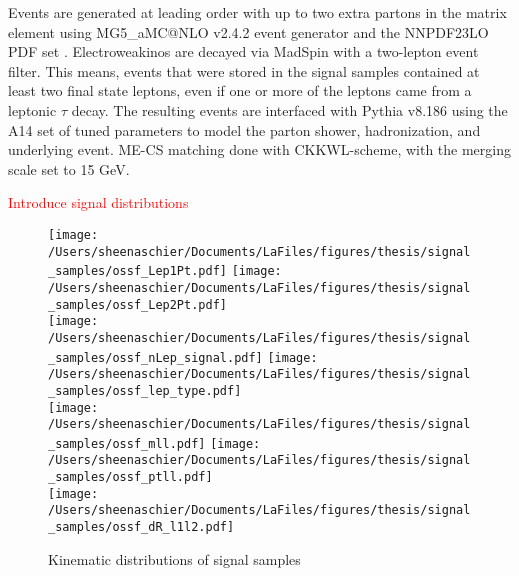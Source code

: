 Events are generated at leading order with up to two extra partons in the matrix element using MG5\_aMC@NLO v2.4.2 event generator \cite{alwall} and the NNPDF23LO PDF set \cite{ball}.  Electroweakinos are decayed via MadSpin \cite{1126-6708-2007-04-081, Artoisenet2013} with a two-lepton event filter.  This means, events that were stored in the signal samples contained at least two final state leptons, even if one or more of the leptons came from a leptonic $\tau$ decay.  The resulting events are interfaced with Pythia v8.186 using the A14 set of tuned parameters to model the parton shower, hadronization, and underlying event.  ME-CS matching done with CKKWL-scheme, with the merging scale set to 15 GeV.



\textcolor{red}{Introduce signal distributions}


  \begin{figure}[tbp]
 \texttt{[image: /Users/sheenaschier/Documents/LaFiles/figures/thesis/signal\_samples/ossf\_Lep1Pt.pdf]}
 \texttt{[image: /Users/sheenaschier/Documents/LaFiles/figures/thesis/signal\_samples/ossf\_Lep2Pt.pdf]}\\
 \texttt{[image: /Users/sheenaschier/Documents/LaFiles/figures/thesis/signal\_samples/ossf\_nLep\_signal.pdf]}
 \texttt{[image: /Users/sheenaschier/Documents/LaFiles/figures/thesis/signal\_samples/ossf\_lep\_type.pdf]}\\
  \texttt{[image: /Users/sheenaschier/Documents/LaFiles/figures/thesis/signal\_samples/ossf\_mll.pdf]}
 \texttt{[image: /Users/sheenaschier/Documents/LaFiles/figures/thesis/signal\_samples/ossf\_ptll.pdf]}\\
  \texttt{[image: /Users/sheenaschier/Documents/LaFiles/figures/thesis/signal\_samples/ossf\_dR\_l1l2.pdf]}

   \caption{Kinematic distributions of signal samples}
   \label{fig:SigSample1}
 \end{figure}
 
